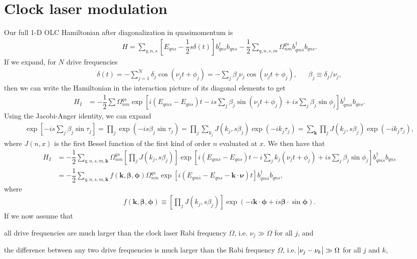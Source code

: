 \documentclass[aps,notitlepage,nofootinbib,10pt]{revtex4-1}
\newcommand{\f}[2]{\dfrac{#1}{#2}} %
\newcommand{\p}[1]{\left(#1\right)} %
\renewcommand{\sp}[1]{\left[#1\right]} %
\renewcommand{\v}{\bm} %
\renewcommand{\c}{\cdot} %
\newcommand{\1}{\mathds{1}}
\begin{document}
\newpage
\section{Clock laser modulation}

Our full 1-D OLC Hamiltonian after diagonalization in quasimomentum is
\begin{align}
  H = \sum_{q,n,s}\sp{E_{qns} - \f12 s\delta\p{t}} b_{qns}^\dag b_{qns}
  - \f12 \sum_{q,n,s,m} \Omega^{qs}_{nm} b_{qm\bar s}^\dag b_{qns}.
\end{align}
If we expand, for $N$ drive frequencies
\begin{align}
  \delta\p{t} = -\sum_{j=1}^N \delta_j \cos\p{\nu_j t + \phi_j}
  = -\sum_j \beta_j \nu_j \cos\p{\nu_j t + \phi_j},
  &&
  \beta_j \equiv \delta_j/\nu_j,
\end{align}
then we can write the Hamiltonian in the interaction picture of its diagonal elements to get
\begin{align}
  H_I
  &= -\f12 \sum \Omega^{qs}_{nm}
  \exp\sp{i\p{E_{qm\bar s} - E_{qns}} t
    - is\sum_j\beta_j\sin\p{\nu_j t+\phi_j}
    + is\sum_j\beta_j\sin\phi_j} b_{qm\bar s}^\dag b_{qns}.
\end{align}
Using the Jacobi-Anger identity, we can expand
\begin{align}
  \exp\sp{-is\sum_j\beta_j\sin\tau_j}
  = \prod_j \exp\p{-is\beta_j\sin\tau_j}
  = \prod_j \sum_{k_j} J\p{k_j,s\beta_j}
  \exp\p{-ik_j\tau_j}
  = \sum_{\v k} \prod_j J\p{k_j,s\beta_j}
  \exp\p{-ik_j\tau_j},
\end{align}
where $J\p{n,x}$ is the first Bessel function of the first kind of
order $n$ evaluated at $x$.  We then have that
\begin{align}
  H_I
  &= -\f12\sum_{q,n,s,m,\v k} \Omega^{qs}_{nm}
  \sp{\prod_j J\p{k_j,s\beta_j}}
  \exp\sp{i\p{E_{qm\bar s}-E_{qns}} t
    - i\sum_jk_j\p{\nu_jt+\phi_j}
    + is\sum_j\beta_j\sin\phi_j}
  b_{qm\bar s}^\dag b_{qns} \\
  &= -\f12\sum_{q,n,s,m,\v k} f\p{\v k,\v\beta,\v\phi}
  \Omega^{qs}_{nm}
  \exp\sp{i\p{E_{qm\bar s}-E_{qns}-\v k\c\v\nu}t}
  b_{qm\bar s}^\dag b_{qns},
\end{align}
where
\begin{align}
  f\p{\v k,\v\beta,\v\phi}
  \equiv \sp{\prod_j J\p{k_j,s\beta_j}}
  \exp\p{-i\v k\c\v\phi + is\v\beta\c\sin\v\phi}.
\end{align}
If we now assume that
\begin{enumerate*}[label=(\roman*)]
\item all drive frequencies are much larger than the clock laser Rabi
  frequency $\Omega$, i.e. $\nu_j\gg\Omega$ for all $j$, and
\item the difference between any two drive frequencies is much larger
  than the Rabi frequency $\Omega$, i.e. $\abs{\nu_j-\nu_k}\gg\Omega$
  for all $j$ and $k$,
\end{enumerate*}
\end{document}

